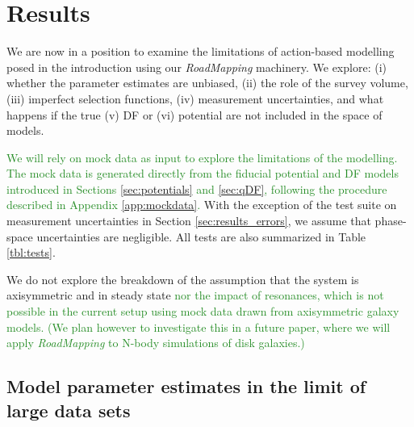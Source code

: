 \documentclass[iop,revtex4,numberedappendix,appendixfloats]{emulateapj}
\newcommand{\RM}{{\sl RoadMapping}}
\newcommand{\NEW}[1]{\textcolor{ForestGreen}{#1}}
\begin{document}
\section{Results} \label{sec:results}

We are now in a position to examine the limitations of action-based modelling posed in the introduction using our \RM{} machinery. We explore: (i) whether the parameter estimates are unbiased, (ii) the role of the survey volume, (iii) imperfect selection functions, (iv) measurement uncertainties, and what happens if the true (v) DF or (vi) potential are not included in the space of models. 

\NEW{We will rely on mock data as input to explore the limitations of the modelling. The mock data is generated directly from the fiducial potential and DF models introduced in Sections \ref{sec:potentials} and \ref{sec:qDF}, following the procedure described in Appendix \ref{app:mockdata}.} With the exception of the test suite on measurement uncertainties in Section \ref{sec:results_errors}, we assume that phase-space uncertainties are negligible. All tests are also summarized in Table \ref{tbl:tests}. 

We do not explore the breakdown of the assumption that the system is axisymmetric and in steady state \NEW{nor the impact of resonances, which is not possible in the current setup using mock data drawn from axisymmetric galaxy models. (We plan however to investigate this in a future paper, where we will apply \RM{} to N-body simulations of disk galaxies.)}


\subsection{Model parameter estimates in the limit of large data sets} \label{sec:largedata}
\end{document}
